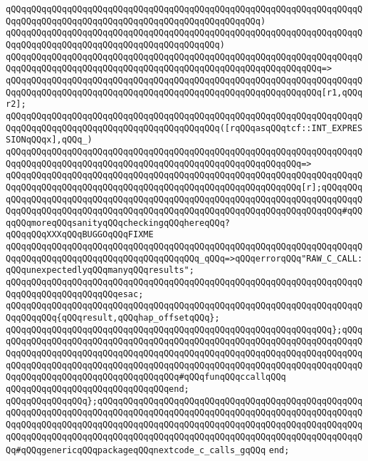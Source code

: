 \verb|qQQqqQQqqQQqqQQqqQQqqQQqqQQqqQQqqQQqqQQqqQQqqQQqqQQqqQQqqQQqqQQqqQQqqQQqqQQqqQQqqQQqqQQqqQQqqQQqqQQqqQQqqQQqqQQqqQQqqQQq)|\newline
\verb|qQQqqQQqqQQqqQQqqQQqqQQqqQQqqQQqqQQqqQQqqQQqqQQqqQQqqQQqqQQqqQQqqQQqqQQqqQQqqQQqqQQqqQQqqQQqqQQqqQQqqQQqqQQqqQQq)|\newline
\verb|qQQqqQQqqQQqqQQqqQQqqQQqqQQqqQQqqQQqqQQqqQQqqQQqqQQqqQQqqQQqqQQqqQQqqQQqqQQqqQQqqQQqqQQqqQQqqQQqqQQqqQQqqQQqqQQqqQQqqQQqqQQqqQQqqQQq=>|\newline
\verb|qQQqqQQqqQQqqQQqqQQqqQQqqQQqqQQqqQQqqQQqqQQqqQQqqQQqqQQqqQQqqQQqqQQqqQQqqQQqqQQqqQQqqQQqqQQqqQQqqQQqqQQqqQQqqQQqqQQqqQQqqQQqqQQqqQQq[r1,qQQqr2];|\newline
\newline
\verb|qQQqqQQqqQQqqQQqqQQqqQQqqQQqqQQqqQQqqQQqqQQqqQQqqQQqqQQqqQQqqQQqqQQqqQQqqQQqqQQqqQQqqQQqqQQqqQQqqQQqqQQqqQQqqQQq([rqQQqasqQQqtcf::INT_EXPRESSIONqQQqx],qQQq_)|\newline
\verb|qQQqqQQqqQQqqQQqqQQqqQQqqQQqqQQqqQQqqQQqqQQqqQQqqQQqqQQqqQQqqQQqqQQqqQQqqQQqqQQqqQQqqQQqqQQqqQQqqQQqqQQqqQQqqQQqqQQqqQQqqQQqqQQq=>|\newline
\verb|qQQqqQQqqQQqqQQqqQQqqQQqqQQqqQQqqQQqqQQqqQQqqQQqqQQqqQQqqQQqqQQqqQQqqQQqqQQqqQQqqQQqqQQqqQQqqQQqqQQqqQQqqQQqqQQqqQQqqQQqqQQqqQQq[r];qQQqqQQqqQQqqQQqqQQqqQQqqQQqqQQqqQQqqQQqqQQqqQQqqQQqqQQqqQQqqQQqqQQqqQQqqQQqqQQqqQQqqQQqqQQqqQQqqQQqqQQqqQQqqQQqqQQqqQQqqQQqqQQqqQQqqQQqqQQqqQQq#qQQqqQQqmoreqQQqsanityqQQqcheckingqQQqhereqQQq?qQQqqQQqXXXqQQqBUGGOqQQqFIXME|\newline
\newline
\verb|qQQqqQQqqQQqqQQqqQQqqQQqqQQqqQQqqQQqqQQqqQQqqQQqqQQqqQQqqQQqqQQqqQQqqQQqqQQqqQQqqQQqqQQqqQQqqQQqqQQqqQQqqQQq_qQQq=>qQQqerrorqQQq"RAW_C_CALL:qQQqunexpectedlyqQQqmanyqQQqresults";|\newline
\verb|qQQqqQQqqQQqqQQqqQQqqQQqqQQqqQQqqQQqqQQqqQQqqQQqqQQqqQQqqQQqqQQqqQQqqQQqqQQqqQQqqQQqqQQqqQQqesac;|\newline
\newline
\verb|qQQqqQQqqQQqqQQqqQQqqQQqqQQqqQQqqQQqqQQqqQQqqQQqqQQqqQQqqQQqqQQqqQQqqQQqqQQqqQQq{qQQqresult,qQQqhap_offsetqQQq};|\newline
\verb|qQQqqQQqqQQqqQQqqQQqqQQqqQQqqQQqqQQqqQQqqQQqqQQqqQQqqQQqqQQqqQQq};qQQqqQQqqQQqqQQqqQQqqQQqqQQqqQQqqQQqqQQqqQQqqQQqqQQqqQQqqQQqqQQqqQQqqQQqqQQqqQQqqQQqqQQqqQQqqQQqqQQqqQQqqQQqqQQqqQQqqQQqqQQqqQQqqQQqqQQqqQQqqQQqqQQqqQQqqQQqqQQqqQQqqQQqqQQqqQQqqQQqqQQqqQQqqQQqqQQqqQQqqQQqqQQqqQQqqQQqqQQqqQQqqQQqqQQqqQQqqQQqqQQqqQQq#qQQqfunqQQqccallqQQq|\newline
\newline
\verb|qQQqqQQqqQQqqQQqqQQqqQQqqQQqqQQqend;|\newline
\verb|qQQqqQQqqQQqqQQq};qQQqqQQqqQQqqQQqqQQqqQQqqQQqqQQqqQQqqQQqqQQqqQQqqQQqqQQqqQQqqQQqqQQqqQQqqQQqqQQqqQQqqQQqqQQqqQQqqQQqqQQqqQQqqQQqqQQqqQQqqQQqqQQqqQQqqQQqqQQqqQQqqQQqqQQqqQQqqQQqqQQqqQQqqQQqqQQqqQQqqQQqqQQqqQQqqQQqqQQqqQQqqQQqqQQqqQQqqQQqqQQqqQQqqQQqqQQqqQQqqQQqqQQqqQQqqQQqqQQqqQQq#qQQqgenericqQQqpackageqQQqnextcode_c_calls_gqQQq|\newline
\verb|end;|\newline

